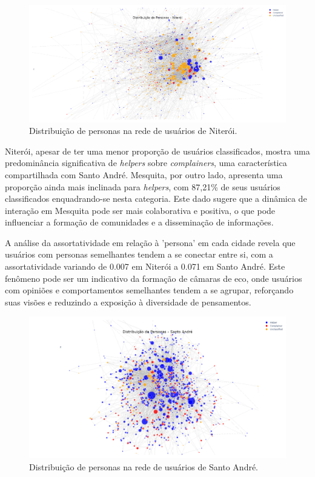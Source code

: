 \begin{figure}[h]
    \centering
    \includegraphics[width=1\textwidth]{images/network_personas_niteroi.png}
    \caption{Distribuição de personas na rede de usuários de Niterói.}
    \label{fig:network_personas_niteroi}
\end{figure}

Niterói, apesar de ter uma menor proporção de usuários classificados, mostra uma predominância significativa de \textit{helpers} sobre \textit{complainers}, uma característica compartilhada com Santo André. Mesquita, por outro lado, apresenta uma proporção ainda mais inclinada para \textit{helpers}, com 87,21\% de seus usuários classificados enquadrando-se nesta categoria. Este dado sugere que a dinâmica de interação em Mesquita pode ser mais colaborativa e positiva, o que pode influenciar a formação de comunidades e a disseminação de informações.

A análise da assortatividade em relação à 'persona' em cada cidade revela que usuários com personas semelhantes tendem a se conectar entre si, com a assortatividade variando de 0.007 em Niterói a 0.071 em Santo André. Este fenômeno pode ser um indicativo da formação de câmaras de eco, onde usuários com opiniões e comportamentos semelhantes tendem a se agrupar, reforçando suas visões e reduzindo a exposição à diversidade de pensamentos.

\begin{figure}[h]
    \centering
    \includegraphics[width=1\textwidth]{images/network_personas_sandre.png}
    \caption{Distribuição de personas na rede de usuários de Santo André.}
    \label{fig:network_personas_sandre}
\end{figure}


